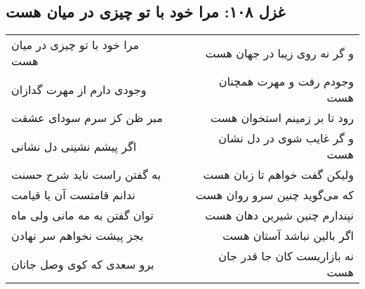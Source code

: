 \begin{center}
\section*{غزل ۱۰۸: مرا خود با تو چیزی در میان هست}
\label{sec:108}
\begin{longtable}{l p{0.5cm} r}
مرا خود با تو چیزی در میان هست
&&
و گر نه روی زیبا در جهان هست
\\
وجودی دارم از مهرت گدازان
&&
وجودم رفت و مهرت همچنان هست
\\
مبر ظن کز سرم سودای عشقت
&&
رود تا بر زمینم استخوان هست
\\
اگر پیشم نشینی دل نشانی
&&
و گر غایب شوی در دل نشان هست
\\
به گفتن راست ناید شرح حسنت
&&
ولیکن گفت خواهم تا زبان هست
\\
ندانم قامتست آن یا قیامت
&&
که می‌گوید چنین سرو روان هست
\\
توان گفتن به مه مانی ولی ماه
&&
نپندارم چنین شیرین دهان هست
\\
بجز پیشت نخواهم سر نهادن
&&
اگر بالین نباشد آستان هست
\\
برو سعدی که کوی وصل جانان
&&
نه بازاریست کان جا قدر جان هست
\\
\end{longtable}
\end{center}
